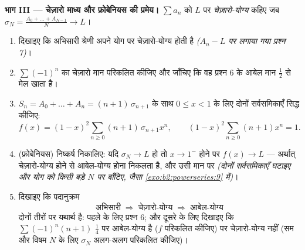 \begin{problem}
\medskip
\noindent\textbf{भाग III --- चेज़ारो माध्य और फ्रोबेनियस की प्रमेय।}
$\sum a_n$ को $L$ पर \emph{चेज़ारो-योग्य} कहिए जब $\sigma_N = \frac{A_0 + \dots + A_{N-1}}{N} \to L$।
\begin{enumerate}[resume]
  \item दिखाइए कि अभिसारी श्रेणी अपने योग पर चेज़ारो-योग्य होती है
        \emph{($A_n - L$ पर लगाया गया प्रश्न 7)}।
  \item $\sum(-1)^n$ का चेज़ारो मान परिकलित कीजिए और जाँचिए कि वह प्रश्न 6 के
        आबेल मान $\frac12$ से मेल खाता है।
  \item $S_n = A_0 + \dots + A_n = (n+1)\,\sigma_{n+1}$ के साथ $0 \leq x < 1$ के लिए दोनों सर्वसमिकाएँ सिद्ध कीजिए:
        \[
        f(x) = (1-x)^2\sum_{n\geq0}(n+1)\,\sigma_{n+1}x^n,
        \qquad
        (1-x)^2\sum_{n\geq0}(n+1)x^n = 1 .
        \]
  \item (फ्रोबेनियस) निष्कर्ष निकालिए: यदि $\sigma_N \to L$ हो तो $x \to 1^-$ होने पर $f(x) \to
        L$ ---
        अर्थात् चेज़ारो-योग्य होने से आबेल-योग्य होना निकलता है, और उसी
        मान पर \emph{(दोनों सर्वसमिकाएँ घटाइए और योग को किसी बड़े $N$ पर
        बाँटिए, जैसा \cref{exo:b2:powerseries:9} में)}।
  \item दिखाइए कि पदानुक्रम
        \[
        \text{अभिसारी} \;\Longrightarrow\;
        \text{चेज़ारो-योग्य} \;\Longrightarrow\;
        \text{आबेल-योग्य}
        \]
        दोनों तीरों पर यथार्थ है: पहले के लिए प्रश्न 6; और दूसरे के लिए
        दिखाइए कि $\sum(-1)^n(n+1)$ $\frac14$ पर आबेल-योग्य है ($f$ परिकलित कीजिए) पर
        चेज़ारो-योग्य नहीं (सम और विषम $N$ के लिए $\sigma_N$ अलग-अलग परिकलित
        कीजिए)।
\end{enumerate}


\end{problem}
